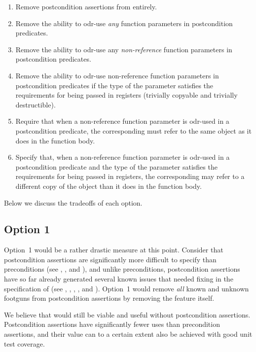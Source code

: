 \begin{enumerate}
\item Remove postcondition assertions from \cite{P2900R10} entirely.
\item Remove the ability to odr-use \emph{any} function parameters in postcondition predicates.
\item Remove the ability to odr-use any \emph{non-reference} function parameters in postcondition predicates.
\item Remove the ability to odr-use non-reference function parameters in postcondition predicates if the type of the parameter satisfies the requirements for being passed in registers (trivially copyable and trivially destructible).
\item Require that when a non-reference function parameter is odr-used in a postcondition predicate, the corresponding  must refer to the same object as it does in the function body.
\item Specify that, when a non-reference function parameter is odr-used in a postcondition predicate and the type of the parameter satisfies the requirements for being passed in registers, the corresponding  may refer to a different copy of the object than it does in the function body.
\end{enumerate}

Below we discuss the tradeoffs of each option.

\subsection*{Option 1}

Option~1 would be a rather drastic measure at this point. Consider that postcondition assertions are significantly more difficult to specify than preconditions (see \cite{P1323R2}, \cite{P3007R0}, and \cite{P3098R0}), and unlike preconditions, postcondition assertions have so far already generated several known issues that needed fixing in the specification of \cite{P2900R10} (see \cite{P3387R0}, \cite{P3460R0}, \cite{P3483R0}, \cite{D3484R1}, and \cite{D3489R0}). Option~1 would remove \emph{all} known and unknown footguns from postcondition assertions by removing the feature itself.

We believe that \cite{P2900R10} would still be viable and useful without postcondition assertions. Postcondition assertions have significantly fewer uses than precondition assertions, and their value can to a certain extent also be achieved with good unit test coverage. 

